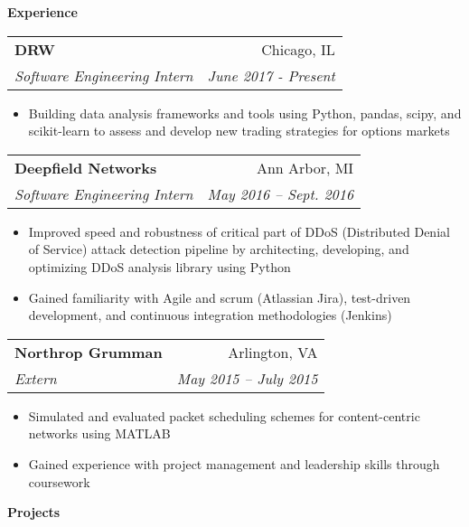 \documentclass[letterpaper,11pt]{article}
\makeatletter
\newcommand{\resitem}[1]{\item #1 \vspace{-2pt}}
\newcommand{\resheading}[1]{{\large \colorbox{mygrey}{\begin{minipage}{\textwidth}{\textbf{#1 \vphantom{p\^{E}}}}\end{minipage}}}}
\newcommand{\ressubheading}[4]{
\begin{tabular*}{6.875in}{l@{\extracolsep{\fill}}r}
		\textbf{#1} & #2 \\
		\textit{#3} & \textit{#4} \\
\end{tabular*}\vspace{-6pt}}
\renewcommand{\footnotesize}{\fontsize{10pt}{11pt}\selectfont}
\makeatother
\begin{document}
		\resheading{Experience}
		\begin{description}
					\item 
			\ressubheading{DRW}{Chicago, IL}
			{Software Engineering Intern}{June 2017 - Present}
			{	
				\footnotesize
				\begin{itemize}
					\resitem{Building data analysis frameworks and tools using Python, pandas, scipy, and scikit-learn to assess and develop new trading strategies for options markets}
				\end{itemize}
			}
			\item 
			\ressubheading{Deepfield Networks}{Ann Arbor, MI}
			{Software Engineering Intern}{May 2016 -- Sept. 2016}
			{	
				\footnotesize
				\begin{itemize}
					\resitem{Improved speed and robustness of critical part of DDoS (Distributed Denial of Service) attack detection pipeline by architecting, developing, and optimizing DDoS analysis library using Python}
					\resitem{Gained familiarity with Agile and scrum (Atlassian Jira), test-driven development, and continuous integration methodologies (Jenkins)}
				\end{itemize}
			}
			\item 
			\ressubheading{Northrop Grumman}{Arlington, VA}
			{Extern}{May 2015 -- July 2015}
			{	
				\footnotesize
				\begin{itemize}
					\resitem{Simulated and evaluated packet scheduling schemes for content-centric networks using MATLAB}
					\resitem{Gained experience with project management and leadership skills through coursework}
				\end{itemize}
			}
			

			
		\end{description}  %
		
		\resheading{Projects}
		
\end{document}
